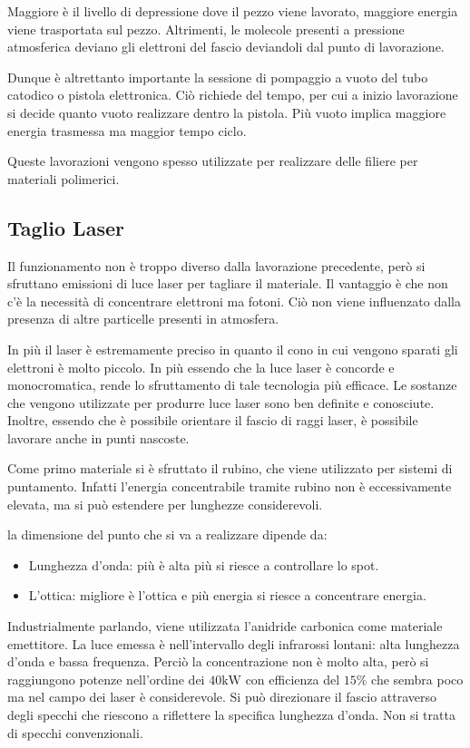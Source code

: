Maggiore è il livello di depressione dove il pezzo viene lavorato, maggiore energia viene trasportata sul pezzo. Altrimenti, le molecole presenti a pressione atmosferica deviano gli elettroni del fascio deviandoli dal punto di lavorazione.

Dunque è altrettanto importante la sessione di pompaggio a vuoto del tubo catodico o pistola elettronica. Ciò richiede del tempo, per cui a inizio lavorazione si decide quanto vuoto realizzare dentro la pistola. Più vuoto implica maggiore energia trasmessa ma maggior tempo ciclo.

Queste lavorazioni vengono spesso utilizzate per realizzare delle filiere per materiali polimerici.

\subsection{Taglio Laser}
Il funzionamento non è troppo diverso dalla lavorazione precedente, però si sfruttano emissioni di luce laser per tagliare il materiale.
Il vantaggio è che non c'è la necessità di concentrare elettroni ma fotoni.
Ciò non viene influenzato dalla presenza di altre particelle presenti in atmosfera.

In più il laser è estremamente preciso in quanto il cono in cui vengono sparati gli elettroni è molto piccolo.
In più essendo che la luce laser è concorde e monocromatica, rende lo sfruttamento di tale tecnologia più efficace.
Le sostanze che vengono utilizzate per produrre luce laser sono ben definite e conosciute.
Inoltre, essendo che è possibile orientare il fascio di raggi laser, è possibile lavorare anche in punti nascoste.

Come primo materiale si è sfruttato il rubino, che viene utilizzato per sistemi di puntamento. Infatti l'energia concentrabile tramite rubino non è eccessivamente elevata, ma si può estendere per lunghezze considerevoli.

la dimensione del punto che si va a realizzare dipende da:
\begin{itemize}
\item Lunghezza d'onda: più è alta più si riesce a controllare lo spot.
\item L'ottica: migliore è l'ottica e più energia si riesce a concentrare energia.
\end{itemize}
Industrialmente parlando, viene utilizzata l'anidride carbonica come materiale emettitore. La luce emessa è nell'intervallo degli infrarossi lontani: alta lunghezza d'onda e bassa frequenza.
Perciò la concentrazione non è molto alta, però si raggiungono potenze nell'ordine dei $40\unit{\kW}$ con efficienza del $15\%$ che sembra poco ma nel campo dei laser è considerevole.
Si può direzionare il fascio attraverso degli specchi che riescono a riflettere la specifica lunghezza d'onda. Non si tratta di specchi convenzionali.

